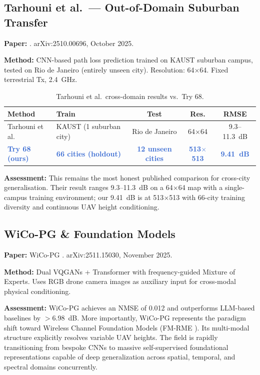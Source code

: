\documentclass[11pt,a4paper]{article}
\newcommand{\ours}[1]{\textcolor{highlight}{\textbf{#1}}}
\begin{document}
\subsection{Tarhouni et al.\ --- Out-of-Domain Suburban Transfer}

\textbf{Paper:} \cite{tarhouni2025}. arXiv:2510.00696, October 2025.

\textbf{Method:} CNN-based path loss prediction trained on KAUST suburban campus, tested on Rio de Janeiro (entirely unseen city). Resolution: 64$\times$64. Fixed terrestrial Tx, 2.4~GHz.

\begin{table}[h!]
\centering
\caption{Tarhouni et al.\ cross-domain results vs.\ Try 68.}
\label{tab:tarhouni}
\begin{tabularx}{\textwidth}{lXccc}
\toprule
\textbf{Method} & \textbf{Train} & \textbf{Test} & \textbf{Res.} & \textbf{RMSE} \\
\midrule
Tarhouni et al. & KAUST (1 suburban city) & Rio de Janeiro & 64$\times$64 & 9.3--11.3~dB \\
\ours{Try 68 (ours)} & \ours{66 cities (holdout)} & \ours{12 unseen cities} & \ours{513$\times$513} & \ours{9.41~dB} \\
\bottomrule
\end{tabularx}
\end{table}

\textbf{Assessment:} This remains the most honest published comparison for cross-city generalisation. Their result ranges 9.3--11.3~dB on a 64$\times$64 map with a single-campus training environment; our 9.41~dB is at 513$\times$513 with 66-city training diversity and continuous UAV height conditioning.

\subsection{WiCo-PG \& Foundation Models}

\textbf{Paper:} WiCo-PG \cite{wicopg2025}. arXiv:2511.15030, November 2025.

\textbf{Method:} Dual VQGANs + Transformer with frequency-guided Mixture of Experts. Uses RGB drone camera images as auxiliary input for cross-modal physical conditioning.

\textbf{Assessment:} WiCo-PG achieves an NMSE of 0.012 and outperforms LLM-based baselines by $>$6.98~dB. More importantly, WiCo-PG represents the paradigm shift toward Wireless Channel Foundation Models (FM-RME \cite{fmrme2026}). Its multi-modal structure explicitly resolves variable UAV heights. The field is rapidly transitioning from bespoke CNNs to massive self-supervised foundational representations capable of deep generalization across spatial, temporal, and spectral domains concurrently.
\end{document}
